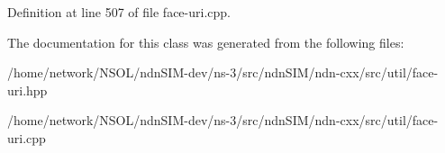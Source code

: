 Definition at line 507 of file face-\/uri.\+cpp.



The documentation for this class was generated from the following files\+:\begin{DoxyCompactItemize}
\item 
/home/network/\+N\+S\+O\+L/ndn\+S\+I\+M-\/dev/ns-\/3/src/ndn\+S\+I\+M/ndn-\/cxx/src/util/face-\/uri.\+hpp\item 
/home/network/\+N\+S\+O\+L/ndn\+S\+I\+M-\/dev/ns-\/3/src/ndn\+S\+I\+M/ndn-\/cxx/src/util/face-\/uri.\+cpp\end{DoxyCompactItemize}
